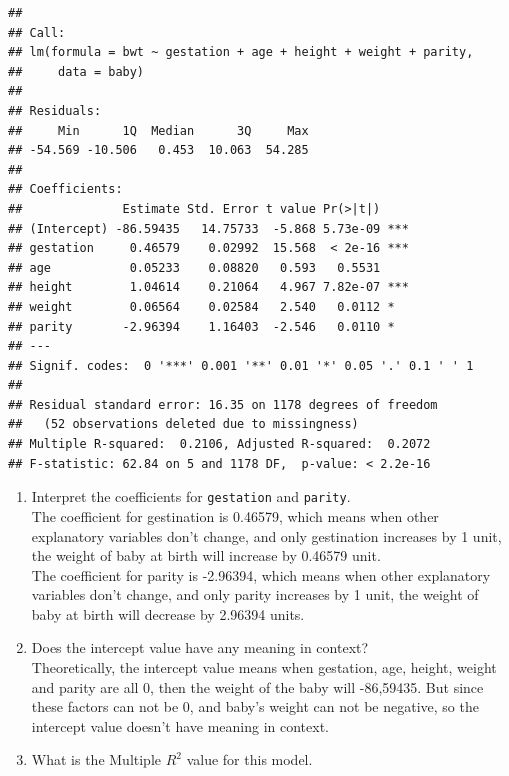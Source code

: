 \documentclass[]{article}
\newenvironment{Shaded}{\begin{snugshade}}{\end{snugshade}}
\newcommand{\KeywordTok}[1]{\textcolor[rgb]{0.13,0.29,0.53}{\textbf{#1}}}
\newcommand{\NormalTok}[1]{#1}
\newcommand{\OperatorTok}[1]{\textcolor[rgb]{0.81,0.36,0.00}{\textbf{#1}}}
\newcommand{\StringTok}[1]{\textcolor[rgb]{0.31,0.60,0.02}{#1}}
\begin{document}
\begin{verbatim}
## 
## Call:
## lm(formula = bwt ~ gestation + age + height + weight + parity, 
##     data = baby)
## 
## Residuals:
##     Min      1Q  Median      3Q     Max 
## -54.569 -10.506   0.453  10.063  54.285 
## 
## Coefficients:
##              Estimate Std. Error t value Pr(>|t|)    
## (Intercept) -86.59435   14.75733  -5.868 5.73e-09 ***
## gestation     0.46579    0.02992  15.568  < 2e-16 ***
## age           0.05233    0.08820   0.593   0.5531    
## height        1.04614    0.21064   4.967 7.82e-07 ***
## weight        0.06564    0.02584   2.540   0.0112 *  
## parity       -2.96394    1.16403  -2.546   0.0110 *  
## ---
## Signif. codes:  0 '***' 0.001 '**' 0.01 '*' 0.05 '.' 0.1 ' ' 1
## 
## Residual standard error: 16.35 on 1178 degrees of freedom
##   (52 observations deleted due to missingness)
## Multiple R-squared:  0.2106, Adjusted R-squared:  0.2072 
## F-statistic: 62.84 on 5 and 1178 DF,  p-value: < 2.2e-16
\end{verbatim}

\begin{enumerate}
\def\labelenumi{\arabic{enumi}.}
\setcounter{enumi}{2}
\item
  Interpret the coefficients for \texttt{gestation} and
  \texttt{parity}.\\
  The coefficient for gestination is 0.46579, which means when other
  explanatory variables don't change, and only gestination increases by
  1 unit, the weight of baby at birth will increase by 0.46579 unit.\\
  The coefficient for parity is -2.96394, which means when other
  explanatory variables don't change, and only parity increases by 1
  unit, the weight of baby at birth will decrease by 2.96394 units.
\item
  Does the intercept value have any meaning in context?\\
  Theoretically, the intercept value means when gestation, age, height,
  weight and parity are all 0, then the weight of the baby will
  -86,59435. But since these factors can not be 0, and baby's weight can
  not be negative, so the intercept value doesn't have meaning in
  context.
\item
  What is the Multiple \(R^2\) value for this model.
\end{enumerate}

\begin{Shaded}
\end{Shaded}
\end{document}
